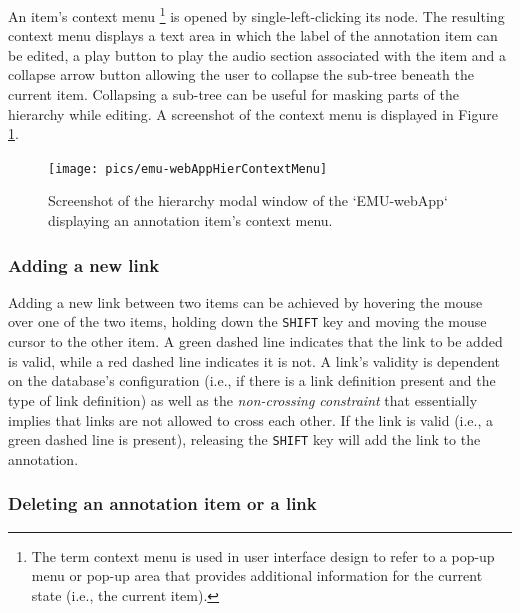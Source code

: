 \documentclass[]{book}
\begin{document}
An item's context menu \footnote{The term context menu is used in user interface design to refer to a pop-up menu or pop-up area that provides additional information for the current state (i.e., the current item).} is opened by single-left-clicking its node. The resulting context menu displays a text area in which the label of the annotation item can be edited, a play button to play the audio section associated with the item and a collapse arrow button allowing the user to collapse the sub-tree beneath the current item. Collapsing a sub-tree can be useful for masking parts of the hierarchy while editing. A screenshot of the context menu is displayed in Figure \ref{fig:webApp-hierContextMenu}.

\begin{figure}

{\centering \texttt{[image: pics/emu-webAppHierContextMenu]} 

}

\caption{Screenshot of the hierarchy modal window of the `EMU-webApp` displaying an annotation item's context menu.}\label{fig:webApp-hierContextMenu}
\end{figure}

\hypertarget{adding-a-new-link}{%
\subsubsection*{Adding a new link}\label{adding-a-new-link}}

Adding a new link between two items can be achieved by hovering the mouse over one of the two items, holding down the \texttt{SHIFT} key and moving the mouse cursor to the other item. A green dashed line indicates that the link to be added is valid, while a red dashed line indicates it is not. A link's validity is dependent on the database's configuration (i.e., if there is a link definition present and the type of link definition) as well as the \emph{non-crossing constraint} \citep{coleman:lp1991a} that essentially implies that links are not allowed to cross each other. If the link is valid (i.e., a green dashed line is present), releasing the \texttt{SHIFT} key will add the link to the annotation.

\hypertarget{deleting-an-annotation-item-or-a-link}{%
\subsubsection*{Deleting an annotation item or a link}\label{deleting-an-annotation-item-or-a-link}}
\end{document}
